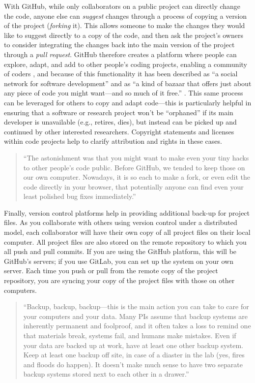 \documentclass[]{tufte-book}
\begin{document}
With GitHub, while only collaborators on a public project can directly change
the code, anyone else can \emph{suggest} changes through a process of copying a
version of the project (\emph{forking} it). This allows someone to make the changes
they would like to suggest directly to a copy of the code, and then ask the
project's owners to consider integrating the changes back into the main version
of the project through a \emph{pull request}. GitHub therefore creates a platform
where people can explore, adapt, and add to other people's coding projects,
enabling a community of coders \citep{perez2016ten}, and because of this
functionality it has been described as ``a social network for software
development'' \citep{perkel2018git} and as ``a kind of bazaar that offers just about
any piece of code you might want---and so much of it free.'' \citep{metz2015github}.
This same process can be leveraged for others to copy and adapt code---this is
particularly helpful in ensuring that a software or research project won't be
``orphaned'' if its main developer is unavailable (e.g., retires, dies), but
instead can be picked up and continued by other interested researchers.
Copyright statements and licenses within code projects help to clarify
attribution and rights in these cases.

\begin{quote}
``The astonishment was that you might want to make even your tiny hacks to
other people's code public. Before GitHub, we tended to keep those on our own
computer. Nowadays, it is so each to make a fork, or even edit the code directly
in your browser, that potentially anyone can find even your least polished
bug fixes immediately.'' \citep{irving2011astonishments}
\end{quote}

Finally, version control platforms help in providing additional back-up for
project files. As you collaborate with others using version control under
a distributed model, each collaborator will have their own copy of all
project files on their local computer. All project files are also
stored on the remote repository to which you all push and pull commits. If you
are using the GitHub platform, this will be GitHub's servers; if you use
GitLab, you can set up the system on your own server. Each time you push
or pull from the remote copy of the project repository, you are syncing your
copy of the project files with those on other computers.

\begin{quote}
``Backup, backup, backup---this is the main action you can take to care for your
computers and your data. Many PIs assume that backup systems are inherently
permanent and foolproof, and it often takes a loss to remind one that
materials break, systems fail, and humans make mistakes. Even if your data
are backed up at work, have at least one other backup system. Keep at least
one backup off site, in case of a diaster in the lab (yes, fires and floods
do happen). It doesn't make much sense to have two separate backup systems stored
next to each other in a drawer.'' \citep{leips2010helm}
\end{quote}
\end{document}
